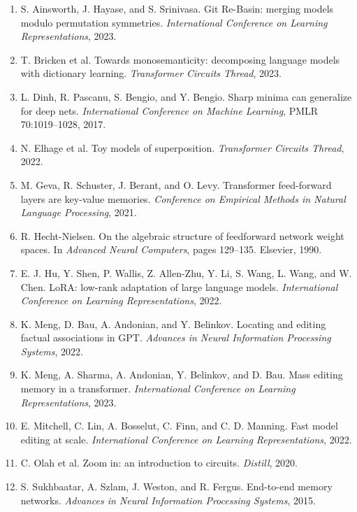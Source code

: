 \documentclass[11pt]{article}
\begin{document}
\small\begin{enumerate}[leftmargin=1.8em,itemsep=1pt,parsep=0pt]
\item S. Ainsworth, J. Hayase, and S. Srinivasa. Git Re-Basin: merging models modulo permutation symmetries.
\emph{International Conference on Learning Representations}, 2023.
\item T. Bricken et al. Towards monosemanticity: decomposing language models with dictionary learning.
\emph{Transformer Circuits Thread}, 2023.
\item L. Dinh, R. Pascanu, S. Bengio, and Y. Bengio. Sharp minima can generalize for deep nets.
\emph{International Conference on Machine Learning}, PMLR 70:1019--1028, 2017.
\item N. Elhage et al. Toy models of superposition. \emph{Transformer Circuits Thread}, 2022.
\item M. Geva, R. Schuster, J. Berant, and O. Levy. Transformer feed-forward layers are key-value memories.
\emph{Conference on Empirical Methods in Natural Language Processing}, 2021.
\item R. Hecht-Nielsen. On the algebraic structure of feedforward network weight spaces. In \emph{Advanced
Neural Computers}, pages 129--135. Elsevier, 1990.
\item E. J. Hu, Y. Shen, P. Wallis, Z. Allen-Zhu, Y. Li, S. Wang, L. Wang, and W. Chen. LoRA: low-rank
adaptation of large language models. \emph{International Conference on Learning Representations}, 2022.
\item K. Meng, D. Bau, A. Andonian, and Y. Belinkov. Locating and editing factual associations in GPT.
\emph{Advances in Neural Information Processing Systems}, 2022.
\item K. Meng, A. Sharma, A. Andonian, Y. Belinkov, and D. Bau. Mass editing memory in a transformer.
\emph{International Conference on Learning Representations}, 2023.
\item E. Mitchell, C. Lin, A. Bosselut, C. Finn, and C. D. Manning. Fast model editing at scale.
\emph{International Conference on Learning Representations}, 2022.
\item C. Olah et al. Zoom in: an introduction to circuits. \emph{Distill}, 2020.
\item S. Sukhbaatar, A. Szlam, J. Weston, and R. Fergus. End-to-end memory networks. \emph{Advances in Neural
Information Processing Systems}, 2015.
\end{enumerate}
\end{document}
